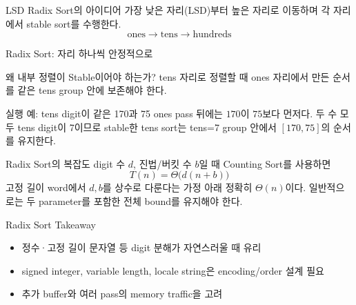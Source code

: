 \begin{frame}{LSD Radix Sort의 아이디어}
\optional[선택 심화]\hfill
가장 낮은 자리(LSD)부터 높은 자리로 이동하며 각 자리에서 \alert{stable sort}를 수행한다.
\[\text{ones}\rightarrow\text{tens}\rightarrow\text{hundreds}\]
\end{frame}
\begin{frame}{Radix Sort: 자리 하나씩 안정적으로}
\centering{}
\end{frame}
\begin{frame}{왜 내부 정렬이 Stable이어야 하는가?}
tens 자리로 정렬할 때 ones 자리에서 만든 순서를 같은 tens group 안에 보존해야 한다.
\begin{exampleblock}{실행 예: tens digit이 같은 170과 75}
ones pass 뒤에는 $170$이 $75$보다 먼저다. 두 수 모두 tens digit이 \alert{7}이므로
stable한 tens sort는 tens=7 group 안에서 $[170,75]$의 순서를 유지한다.
\end{exampleblock}
\end{frame}
\begin{frame}{Radix Sort의 복잡도}
digit 수 $d$, 진법/버킷 수 $b$일 때 Counting Sort를 사용하면
\[T(n)=\Theta\bigl(d(n+b)\bigr)\]
고정 길이 word에서 $d,b$를 상수로 다룬다는 가정 아래 정확히 $\Theta(n)$이다.
일반적으로는 두 parameter를 포함한 전체 bound를 유지해야 한다.
\end{frame}
\begin{frame}{Radix Sort Takeaway}
\begin{itemize}\item 정수·고정 길이 문자열 등 digit 분해가 자연스러울 때 유리\item signed integer, variable length, locale string은 encoding/order 설계 필요\item 추가 buffer와 여러 pass의 memory traffic을 고려\end{itemize}
\end{frame}
